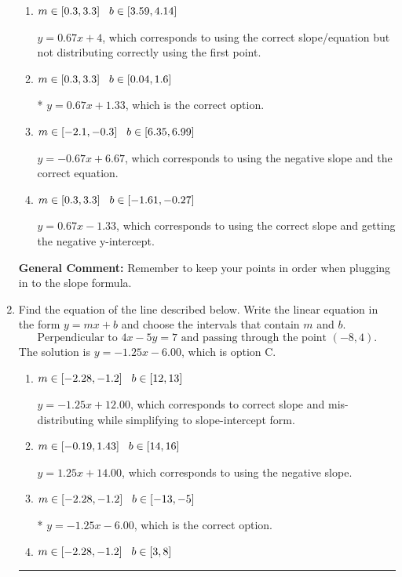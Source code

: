 \documentclass{extbook}[14pt]
\newcommand{\litem}[1]{\item #1

\rule{\textwidth}{0.4pt}}
\begin{document}
\begin{enumerate}
{\begin{enumerate}[label=\Alph*.]
 $y = 0.67x$, which corresponds to using the correct slope/equation but not distributing correctly using the second point.
\item \( m \in [0.3, 3.3] \hspace*{3mm} b \in [3.59, 4.14] \)

 $y = 0.67x + 4$, which corresponds to using the correct slope/equation but not distributing correctly using the first point.
\item \( m \in [0.3, 3.3] \hspace*{3mm} b \in [0.04, 1.6] \)

* $y = 0.67x + 1.33$, which is the correct option.
\item \( m \in [-2.1, -0.3] \hspace*{3mm} b \in [6.35, 6.99] \)

 $y = -0.67x + 6.67$, which corresponds to using the negative slope and the correct equation.
\item \( m \in [0.3, 3.3] \hspace*{3mm} b \in [-1.61, -0.27] \)

 $y = 0.67x -1.33$, which corresponds to using the correct slope and getting the negative y-intercept.
\end{enumerate}

\textbf{General Comment:} Remember to keep your points in order when plugging in to the slope formula.
}
\litem{
Find the equation of the line described below. Write the linear equation in the form $ y=mx+b $ and choose the intervals that contain $m$ and $b$.
\[ \text{Perpendicular to } 4 x - 5 y = 7 \text{ and passing through the point } (-8, 4). \]The solution is \( y = -1.25x - 6.00 \), which is option C.\begin{enumerate}[label=\Alph*.]
\item \( m \in [-2.28, -1.2] \hspace*{3mm} b \in [12, 13] \)

 $y = -1.25x + 12.00$, which corresponds to correct slope and mis-distributing while simplifying to slope-intercept form.
\item \( m \in [-0.19, 1.43] \hspace*{3mm} b \in [14, 16] \)

 $y = 1.25x + 14.00$, which corresponds to using the negative slope.
\item \( m \in [-2.28, -1.2] \hspace*{3mm} b \in [-13, -5] \)

* $y = -1.25x - 6.00$, which is the correct option.
\item \( m \in [-2.28, -1.2] \hspace*{3mm} b \in [3, 8] \)


\end{enumerate}}
\end{enumerate}
\end{document}
